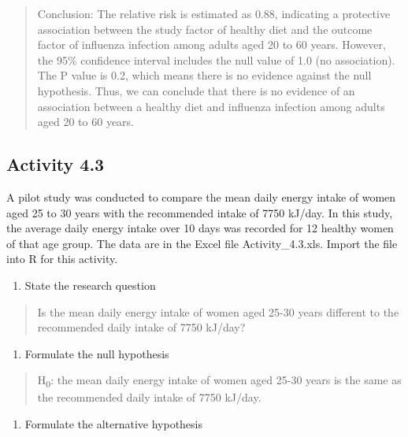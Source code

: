 \documentclass[
]{memoir}
\providecommand{\tightlist}{%
  \setlength{\itemsep}{0pt}\setlength{\parskip}{0pt}}
\begin{document}
\begin{quote}
Conclusion: The relative risk is estimated as 0.88, indicating a protective association between the study factor of healthy diet and the outcome factor of influenza infection among adults aged 20 to 60 years. However, the 95\% confidence interval includes the null value of 1.0 (no association). The P value is 0.2, which means there is no evidence against the null hypothesis. Thus, we can conclude that there is no evidence of an association between a healthy diet and influenza infection among adults aged 20 to 60 years.
\end{quote}

\hypertarget{activity-4.3}{%
\subsection*{Activity 4.3}\label{activity-4.3}}

A pilot study was conducted to compare the mean daily energy intake of women aged 25 to 30 years with the recommended intake of 7750 kJ/day. In this study, the average daily energy intake over 10 days was recorded for 12 healthy women of that age group. The data are in the Excel file Activity\_4.3.xls. Import the file into R for this activity.

\begin{enumerate}
\def\labelenumi{\alph{enumi})}
\tightlist
\item
  State the research question
\end{enumerate}

\begin{quote}
Is the mean daily energy intake of women aged 25-30 years different to the recommended daily intake of 7750 kJ/day?
\end{quote}

\begin{enumerate}
\def\labelenumi{\alph{enumi})}
\setcounter{enumi}{1}
\tightlist
\item
  Formulate the null hypothesis
\end{enumerate}

\begin{quote}
H\textsubscript{0}: the mean daily energy intake of women aged 25-30 years is the same as the recommended daily intake of 7750 kJ/day.
\end{quote}

\begin{enumerate}
\def\labelenumi{\alph{enumi})}
\setcounter{enumi}{2}
\tightlist
\item
  Formulate the alternative hypothesis
\end{enumerate}
\end{document}
